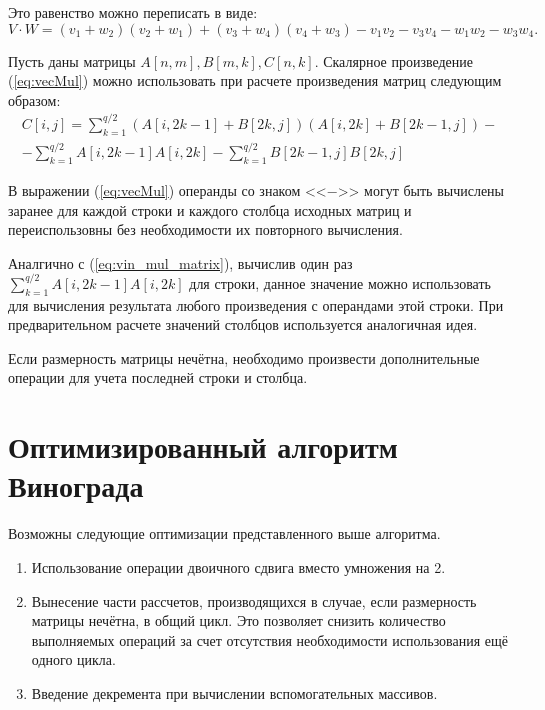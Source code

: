 Это равенство можно переписать в виде:
\begin{equation}
	\label{eq:vecMul}
	V \cdot W = (v_1 + w_2)(v_2 + w_1) + (v_3 + w_4)(v_4 + w_3) - v_1v_2 - v_3v_4 - w_1w_2 - w_3w_4.	
\end{equation}

Пусть даны матрицы $A[n, m], B[m, k], C[n, k]$. Скалярное произведение (\ref{eq:vecMul}) можно использовать при расчете произведения матриц следующим образом:
\begin{multline} 
	\label{eq:vin_mul_matrix}
	C[i, j] = \sum_{k=1}^{q/2}(A[i, 2k-1] + B[2k, j])(A[i, 2k] + B[2k-1, j]) - \\
	- \sum_{k=1}^{q/2} A[i, 2k-1]A[i, 2k] - \sum_{k=1}^{q/2} B[2k-1, j]B[2k, j]
\end{multline}

В выражении (\ref{eq:vecMul}) операнды со знаком <<$-$>> могут быть вычислены заранее для каждой строки и каждого столбца исходных матриц и переиспользовны без необходимости их повторного вычисления.

Аналгично с (\ref{eq:vin_mul_matrix}), вычислив один раз $\sum_{k=1}^{q/2}A[i, 2k-1]A[i, 2k]$ для строки, данное значение можно использовать для вычисления результата любого произведения с операндами этой строки. При предварительном расчете значений столбцов используется аналогичная идея.

Если размерность матрицы нечётна, необходимо произвести дополнительные операции для учета последней строки и столбца.

\section{Оптимизированный алгоритм Винограда}

Возможны следующие оптимизации представленного выше алгоритма.
\begin{enumerate}
\item Использование операции двоичного сдвига вместо умножения на 2. 
\item Вынесение части рассчетов, производящихся в случае, если размерность матрицы нечётна, в общий цикл. Это позволяет снизить количество выполняемых операций за счет отсутствия необходимости использования ещё одного цикла.
\item Введение декремента при вычислении вспомогательных массивов. 
\end{enumerate}
